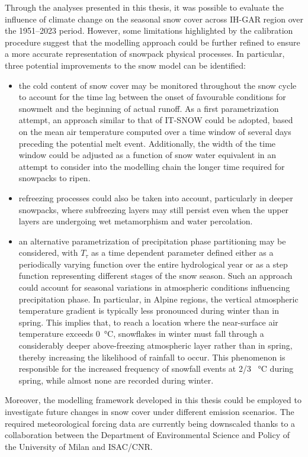 Through the analyses presented in this thesis, it was possible to evaluate the influence of climate change on the seasonal snow cover across IH-GAR region 
over the 1951--2023 period. However, some limitations highlighted by the calibration procedure suggest that the modelling approach could be further 
refined to ensure a more accurate representation of snowpack physical processes. In particular, three potential improvements to the snow model can be 
identified:
\begin{itemize}[label=$\blacktriangleright$]
    \item the cold content of snow cover may be monitored throughout the snow cycle to account for the time lag between the onset of favourable 
    conditions for snowmelt and the beginning of actual runoff. As a first parametrization attempt, an approach similar to that of IT-SNOW could be 
    adopted, based on the mean air temperature computed over a time window of several days preceding the potential melt event. Additionally, the width 
    of the time window could be adjusted as a function of snow water equivalent in an attempt to consider into the modelling chain the longer time 
    required for snowpacks to ripen. 
    \item refreezing processes could also be taken into account, particularly in deeper snowpacks, where subfreezing layers may still persist even when 
    the upper layers are undergoing wet metamorphism and water percolation. 
    \item an alternative parametrization of precipitation phase partitioning may be considered, with $T_\tau$ as a time dependent parameter defined 
    either as a periodically varying function over the entire hydrological year or as a step function representing different stages of the snow season. 
    Such an approach could account for seasonal variations in atmospheric conditions influencing precipitation phase. In particular, in Alpine regions, 
    the vertical atmospheric temperature gradient is typically less pronounced during winter than in spring. This implies that, to reach a location 
    where the near-surface air temperature exceeds \SI{0}{\degreeCelsius}, snowflakes in winter must fall through a considerably deeper above-freezing 
    atmospheric layer rather than in spring, thereby increasing the likelihood of rainfall to occur. This phenomenon is responsible for the increased 
    frequency of snowfall events at 2/3 \SI{}{\degreeCelsius} during spring, while almost none are recorded during winter.
\end{itemize}
Moreover, the modelling framework developed in this thesis could be employed to investigate future changes in snow cover under different emission 
scenarios. The required meteorological forcing data are currently being downscaled thanks to a collaboration between the Department of Environmental 
Science and Policy of the University of Milan and ISAC/CNR.
